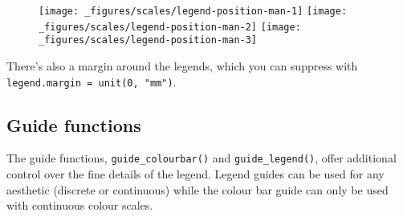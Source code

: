 \begin{Shaded}
\begin{Highlighting}[]
\StringTok{ }\OperatorTok{+}\StringTok{ }
\StringTok{  }\NormalTok{(}\NormalTok{(} \NormalTok{)}

\OperatorTok{+}\StringTok{ }\NormalTok{(} \NormalTok{(}\NormalTok{, }\NormalTok{), } \NormalTok{(}\NormalTok{, }\NormalTok{))}
\OperatorTok{+}\StringTok{ }\NormalTok{(} \NormalTok{(}\NormalTok{, }\NormalTok{), } \NormalTok{(}\NormalTok{, }\NormalTok{))}
\OperatorTok{+}\StringTok{ }\NormalTok{(} \NormalTok{(}\NormalTok{, }\NormalTok{), } \NormalTok{(}\NormalTok{, }\NormalTok{))}
\end{Highlighting}
\end{Shaded}

\begin{figure}[H]
  \texttt{[image: \_figures/scales/legend-position-man-1]}%
  \texttt{[image: \_figures/scales/legend-position-man-2]}%
  \texttt{[image: \_figures/scales/legend-position-man-3]}
\end{figure}

There's also a margin around the legends, which you can suppress with
\texttt{legend.margin\ =\ unit(0,\ "mm")}.

\hypertarget{guide-functions}{%
\subsection{Guide functions}\label{guide-functions}}

The guide functions, \texttt{guide\_colourbar()} and
\texttt{guide\_legend()}, offer additional control over the fine details
of the legend. Legend guides can be used for any aesthetic (discrete or
continuous) while the colour bar guide can only be used with continuous
colour scales.

